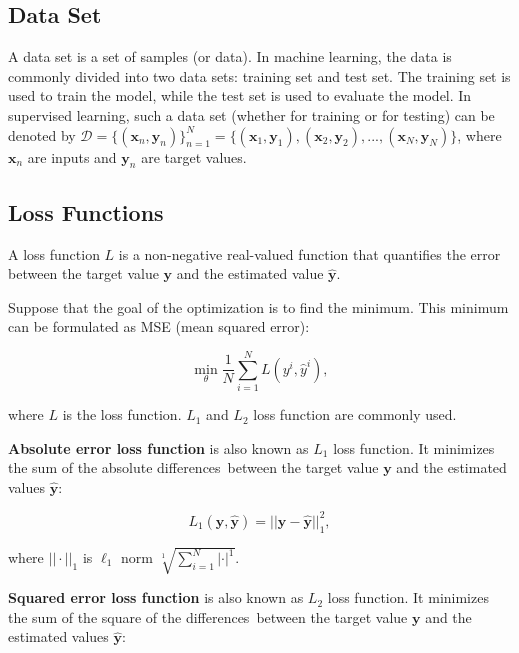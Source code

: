 \documentclass[
	parskip, 			   %
	twoside, 			   %
	DIV=14, 			   %
	BCOR=15.0mm, 		   %
	headsepline, 		   %
	open=right, 		   %
	captions=tableheading, %
	bibliography=totoc,    %
	numbers=noenddot       %
]{scrreprt}
\begin{document}
\subsection{Data Set}
A data set is a set of samples (or data). In machine learning, the data is commonly divided into two data sets: training set and test set. The training set is used to train the model, while the test set is used to evaluate the model. In supervised learning, such a data set (whether for training or for testing) can be denoted by $\mathcal{D}=\{ (\mathbf{x}_{n}, \mathbf{y}_{n}) \}_{n=1}^{N} = \{ (\mathbf{x}_{1}, \mathbf{y}_{1}),  (\mathbf{x}_{2}, \mathbf{y}_{2}), ..., (\mathbf{x}_{N}, \mathbf{y}_{N}) \}$, where $\mathbf{x}_{n}$ are inputs and $\mathbf{y}_{n}$ are target values.

\subsection{Loss Functions}
A loss function $L$ is a non-negative real-valued function that quantifies the error between the target value $\mathbf{y}$ and the estimated value $\hat{\mathbf{y}}$. 

Suppose that the goal of the optimization is to find the minimum. This minimum can be formulated as MSE (mean squared error):

\begin{equation}
    \label{eq:minimum}
    \min _\theta \frac{1}{N} \sum_{i=1}^N L\left(y^i, \hat{y}^i\right),
\end{equation}

where $L$ is the loss function. $L_{1}$ and $L_{2}$ loss function are commonly used.

\textbf{Absolute error loss function} is also known as $L_{1}$ loss function. It minimizes the sum of the absolute differences between the target value $\mathbf{y}$ and the estimated values $\hat{\mathbf{y}}$:

\begin{equation}
    \label{eq:AE_loss}
    L_{1}( \mathbf{y}, \hat{\mathbf{y}} ) = ||\mathbf{y}-\hat{\mathbf{y}}||^{2}_{1},
\end{equation}

where $|| \cdot ||_{1}$ is $\ell_1$ norm $\sqrt[1]{\sum_{i=1}^N | \cdot |^1}$.

\textbf{Squared error loss function} is also known as $L_{2}$ loss function. It minimizes the sum of the square of the differences between the target value $\mathbf{y}$ and the estimated values $\hat{\mathbf{y}}$:
\end{document}

